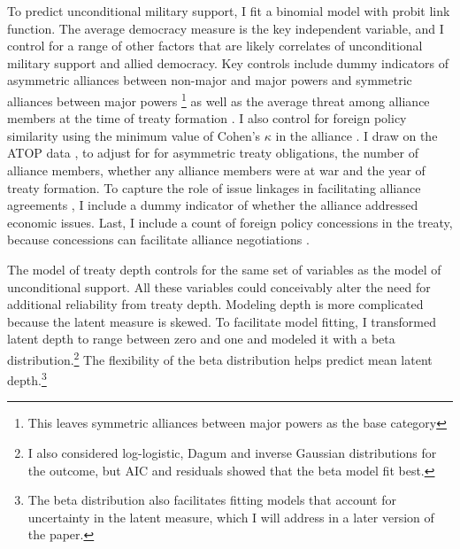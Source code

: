\documentclass[12pt]{article}
\begin{document}
To predict unconditional military support, I fit a binomial model with probit link function. 
The average democracy measure is the key independent variable, and I control for a range of other factors that are likely correlates of unconditional military support and allied democracy. 
Key controls include dummy indicators of asymmetric alliances between non-major and major powers and symmetric alliances between major powers \citep{Mattes2012}\footnote{This leaves symmetric alliances between major powers as the base category} as well as the average threat among alliance members at the time of treaty formation \citep{LeedsSavun2007}. 
I also control for foreign policy similarity \citep{Benson2012} using the minimum value of Cohen's $\kappa$ in the alliance \citep{Hage2011}.
I draw on the ATOP data \citep{Leedsetal2002}, to adjust for for asymmetric treaty obligations, the number of alliance members, whether any alliance members were at war and the year of treaty formation. 
To capture the role of issue linkages in facilitating alliance agreements \citep{Poast2012, Poast2013}, I include a dummy indicator of whether the alliance addressed economic issues.  
Last, I include a count of foreign policy concessions in the treaty, because concessions can facilitate alliance negotiations \citep{Johnson2015}. 


The model of treaty depth controls for the same set of variables as the model of unconditional support. 
All these variables could conceivably alter the need for additional reliability from treaty depth. 
Modeling depth is more complicated because the latent measure is skewed.
To facilitate model fitting, I transformed latent depth to range between zero and one and modeled it with a beta distribution.\footnote{I also considered log-logistic, Dagum and inverse Gaussian distributions for the outcome, but AIC and residuals showed that the beta model fit best.}
The flexibility of the beta distribution helps predict mean latent depth.\footnote{The beta distribution also facilitates fitting models that account for uncertainty in the latent measure, which I will address in a later version of the paper.} 
\end{document}
